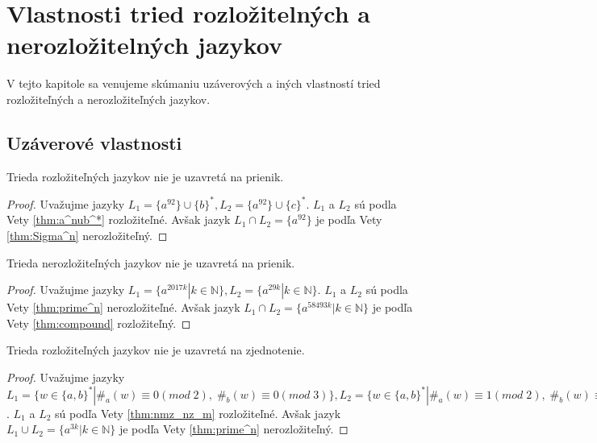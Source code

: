 \chapter[Vlastnosti tried rozložitelných a nerozložitelných jazykov]{Vlastnosti tried rozložitelných a nerozložitelných jazykov}
\label{kap:properties_of_classes}

V tejto kapitole sa venujeme skúmaniu uzáverových a iných vlastností tried rozložiteľných a nerozložiteľných jazykov.

\section{Uzáverové vlastnosti}

\begin{theorem}
Trieda rozložiteľných jazykov nie je uzavretá na prienik.
\end{theorem}

\begin{proof}
Uvažujme jazyky $ L_1 = \lbrace a^{92} \rbrace \cup \lbrace b \rbrace^*, L_2 = \lbrace a^{92} \rbrace \cup \lbrace c \rbrace^* $. $ L_1 $ a $ L_2 $ sú podla Vety \ref{thm:a^nub^*} rozložiteľné. Avšak jazyk $ L_1 \cap L_2 = \lbrace a^{92} \rbrace $ je podľa Vety \ref{thm:Sigma^n} nerozložiteľný.
\end{proof}

\begin{theorem}
Trieda nerozložiteľných jazykov nie je uzavretá na prienik.
\end{theorem}

\begin{proof}
Uvažujme jazyky $ L_1 = \lbrace a^{2017k} | k \in \mathbb{N} \rbrace, L_2 = \lbrace a^{29k} | k \in \mathbb{N} \rbrace $. $ L_1 $ a $ L_2 $ sú podla Vety \ref{thm:prime^n} nerozložiteľné. Avšak jazyk $ L_1 \cap L_2 = \lbrace a^{58493k} | k \in \mathbb{N} \rbrace $ je podľa Vety \ref{thm:compound} rozložiteľný.
\end{proof}

\begin{theorem}
Trieda rozložiteľných jazykov nie je uzavretá na zjednotenie.
\end{theorem}

\begin{proof}
Uvažujme jazyky $ L_1 = \lbrace w \in \lbrace a,b \rbrace^* | \#_a(w) \equiv 0 (mod \; 2), \; \#_b(w) \equiv 0 (mod \; 3) \rbrace, L_2 = \lbrace w \in \lbrace a,b \rbrace^* | \#_a(w) \equiv 1 (mod \; 2), \; \#_b(w) \equiv 0 (mod \; 3) \rbrace $. $ L_1 $ a $ L_2 $ sú podľa Vety \ref{thm:nmz_nz_m} rozložiteľné. Avšak jazyk $ L_1 \cup L_2 = \lbrace a^{3k} | k \in \mathbb{N} \rbrace $ je podľa Vety \ref{thm:prime^n} nerozložiteľný.
\end{proof}

